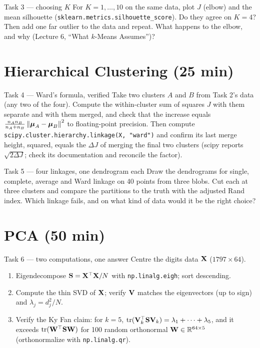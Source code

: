 \documentclass[11pt]{article}
\begin{document}
\begin{task}{Task 3 --- choosing $K$}
For $K=1,\dots,10$ on the same data, plot $J$ (elbow) and the mean silhouette
(\texttt{sklearn.metrics.silhouette\_score}). Do they agree on $K=4$? Then add one far outlier to the data
and repeat. What happens to the elbow, and why (Lecture 6, ``What $k$-Means Assumes'')?
\end{task}

\section{Hierarchical Clustering (25 min)}

\begin{task}{Task 4 --- Ward's formula, verified}
Take two clusters $A$ and $B$ from Task 2's data (any two of the four). Compute the within-cluster sum of
squares $J$ with them separate and with them merged, and check that the increase equals
$\frac{n_An_B}{n_A+n_B}\left\lVert \boldsymbol{\mu}_A-\boldsymbol{\mu}_B \right\rVert^2$ to floating-point precision. Then compute
\texttt{scipy.cluster.hierarchy.linkage(X, "ward")} and confirm its last merge height, squared, equals the
$\Delta J$ of merging the final two clusters (scipy reports $\sqrt{2\Delta J}$; check its documentation and
reconcile the factor).
\end{task}

\begin{task}{Task 5 --- four linkages, one dendrogram each}
Draw the dendrograms for single, complete, average and Ward linkage on 40 points from three blobs.
Cut each at three clusters and compare the partitions to the truth with the adjusted Rand index. Which linkage
fails, and on what kind of data would it be the right choice?
\end{task}

\section{PCA (50 min)}

\begin{task}{Task 6 --- two computations, one answer}
Centre the digits data $\mathbf{X}$ ($1797\times64$).
\begin{enumerate}[nosep]
  \item Eigendecompose $\mathbf{S}=\mathbf{X}^{\top}\mathbf{X}/N$ with \texttt{np.linalg.eigh}; sort descending.
  \item Compute the thin SVD of $\mathbf{X}$; verify $\mathbf{V}$ matches the eigenvectors (up to sign) and $\lambda_j=d_j^2/N$.
  \item Verify the Ky Fan claim: for $k=5$, $\operatorname{tr}(\mathbf{V}_k^{\top}\mathbf{S}\mathbf{V}_k)=\lambda_1+\dots+\lambda_5$, and it exceeds
        $\operatorname{tr}(\mathbf{W}^{\top}\mathbf{S}\mathbf{W})$ for 100 random orthonormal $\mathbf{W}\in\mathbb{R}^{64\times5}$ (orthonormalize with \texttt{np.linalg.qr}).
\end{enumerate}
\end{task}
\end{document}
